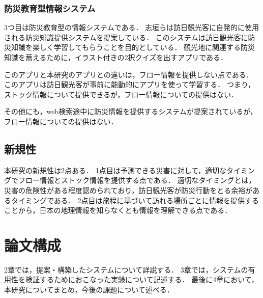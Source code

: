 \documentclass[a4paper,11pt,oneside,openany]{jsbook}
\begin{document}
\subsubsection{防災教育型情報システム}
3つ目は防災教育型の情報システムである．
志垣ら\cite{1390855511130932864}は訪日観光客に自発的に使用される防災知識提供システムを提案している．
このシステムは訪日観光客に防災知識を楽しく学習してもらうことを目的としている．
観光地に関連する防災知識を蓄えるために，イラスト付きの2択クイズを出すアプリである．

このアプリと本研究のアプリとの違いは，フロー情報を提供しない点である．
このアプリは訪日観光客が事前に能動的にアプリを使って学習する．
つまり，ストック情報について提供できるが，フロー情報についての提供はない．

その他にも，web検索途中に防災情報を提供するシステム\cite{1050292572146543616}が提案されているが，フロー情報についての提供はない．

\subsection{新規性}
本研究の新規性は2点ある．
1点目は予測できる災害に対して，適切なタイミングでフロー情報とストック情報を提供する点である．
適切なタイミングとは，災害の危険性がある程度認められており，訪日観光客が防災行動をとる余裕があるタイミングである．
2点目は旅程に基づいて訪れる場所ごとに情報を提供することから，日本の地理情報を知らなくとも情報を理解できる点である．

\section{論文構成}
2章では，提案・構築したシステムについて詳説する．
3章では，システムの有用性を検証するためにおこなった実験について記述する．
最後に4章において，本研究についてまとめ，今後の課題について述べる．
\end{document}
